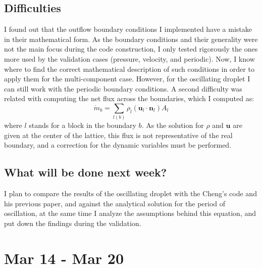 \documentclass[12pt]{article}
\begin{document}
	\subsection*{Difficulties}
	I found out that the outflow boundary conditions I implemented have a mistake in their mathematical form. As the boundary conditions and their generality were not the main focus during the code construction, I only tested rigorously the ones more used by the validation cases (pressure, velocity, and periodic). Now, I know where to find the correct mathematical description of such conditions in order to apply them for the multi-component case. However, for the oscillating droplet I can still work with the periodic boundary conditions. A second difficulty was related with computing the net flux across the boundaries, which I computed as:
	\begin{equation*}
		\dot{m}_b = \sum_{l(b)} \rho_l (\mathbf{u}_l \cdot \mathbf{n}_l) A_l 
	\end{equation*}
	where $l$ stands for a block in the boundary $b$. As the solution for $\rho$ and $\mathbf{u}$ are given at the center of the lattice, this flux is not representative of the real boundary, and a correction for the dynamic variables must be performed. 
	
	\subsection*{What will be done next week?}
	I plan to compare the results of the oscillating droplet with the Cheng's code and his previous paper, and against the analytical solution for the period of oscillation, at the same time I analyze the assumptions behind this equation, and put down the findings during the validation.
	
	\pagebreak
	\section*{Mar 14 - Mar 20}
\end{document}
